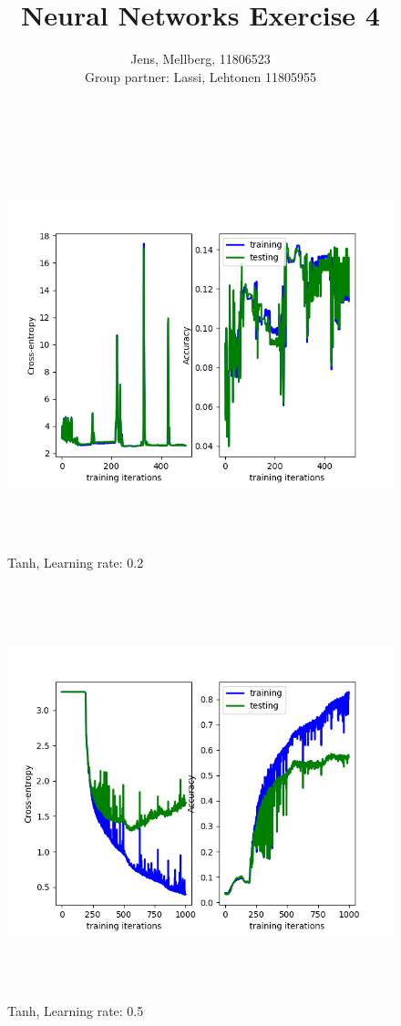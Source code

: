 \documentclass[a4paper]{article}
\title{Neural Networks Exercise 4}
\author{Jens, Mellberg, 11806523\\
		Group partner: Lassi, Lehtonen 11805955}
\begin{document}
\maketitle


   \begin{figure}[h]
\caption{Tanh, Learning rate: 0.2}
\centering
\includegraphics[width=15cm, height=12cm]{LR02.png}
\end{figure}

   \begin{figure}[h]
\caption{Tanh, Learning rate: 0.5}
\centering
\includegraphics[width=15cm, height=12cm]{LR05.png}
\end{figure}
\end{document}
